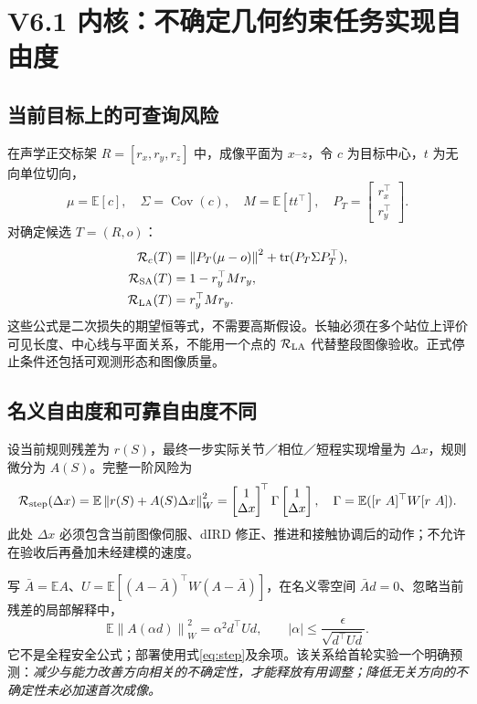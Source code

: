 \documentclass[UTF8,fontset=fandol,11pt,a4paper]{ctexart}
\theoremstyle{plain}
\theoremstyle{definition}
\theoremstyle{remark}
\numberwithin{equation}{section}
\newcommand{\E}{\mathbb E}
\newcommand{\norm}[1]{\left\lVert#1\right\rVert}
\DeclareMathOperator{\tr}{tr}
\DeclareMathOperator{\Cov}{Cov}
\begin{document}
\section{V6.1 内核：不确定几何约束任务实现自由度}
\label{sec:realize}
\subsection{当前目标上的可查询风险}
在声学正交标架 $R=[r_x,r_y,r_z]$ 中，成像平面为 $x$--$z$，令 $c$ 为目标中心，$t$ 为无向单位切向，
\begin{equation}
 \mu=\E[c],\quad \Sigma=\Cov(c),\quad M=\E[tt^\top],\quad
 P_T=\begin{bmatrix}r_x^\top\\r_y^\top\end{bmatrix}.
\end{equation}
对确定候选 $T=(R,o)$：
\begin{align}
 \mathcal R_c(T)&=\norm{P_T(\mu-o)}^2+\tr(P_T\Sigma P_T^\top),\\
 \mathcal R_{\rm SA}(T)&=1-r_y^\top Mr_y,\\
 \mathcal R_{\rm LA}(T)&=r_y^\top Mr_y.
 \label{eq:moments}
\end{align}
这些公式是二次损失的期望恒等式，不需要高斯假设。长轴必须在多个站位上评价可见长度、中心线与平面关系，不能用一个点的 $\mathcal R_{\rm LA}$ 代替整段图像验收。正式停止条件还包括可观测形态和图像质量。

\subsection{名义自由度和可靠自由度不同}
设当前规则残差为 $r(S)$，最终一步实际关节／相位／短程实现增量为 $\Delta x$，规则微分为 $A(S)$。完整一阶风险为
\begin{equation}
 \mathcal R_{\rm step}(\Delta x)=
 \E\norm{r(S)+A(S)\Delta x}_W^2
 =\begin{bmatrix}1\\\Delta x\end{bmatrix}^{\!\top}
 \Gamma
 \begin{bmatrix}1\\\Delta x\end{bmatrix},
\quad
 \Gamma=\E([r\ A]^\top W[r\ A]).
 \label{eq:step}
\end{equation}
此处 $\Delta x$ 必须包含当前图像伺服、dIRD 修正、推进和接触协调后的动作；不允许在验收后再叠加未经建模的速度。

写 $\bar A=\E A$、$U=\E[(A-\bar A)^\top W(A-\bar A)]$，在名义零空间 $\bar A d=0$、忽略当前残差的局部解释中，
\begin{equation}
 \E\norm{A(\alpha d)}_W^2=\alpha^2d^\top Ud,
 \qquad
 |\alpha|\le \frac{\epsilon}{\sqrt{d^\top Ud}}.
 \label{eq:freedom}
\end{equation}
它不是全程安全公式；部署使用式\eqref{eq:step}及余项。该关系给首轮实验一个明确预测：\emph{减少与能力改善方向相关的不确定性，才能释放有用调整；降低无关方向的不确定性未必加速首次成像。}
\end{document}
